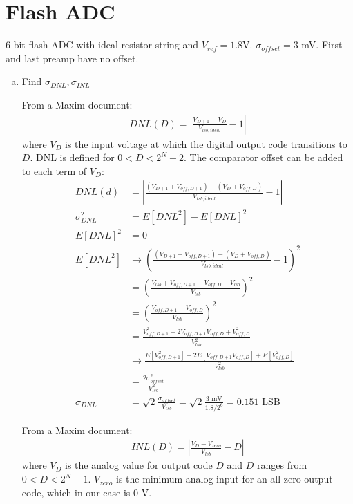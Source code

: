 \documentclass[11pt]{article}
\begin{document}
\section*{Flash ADC}

6-bit flash ADC with ideal resistor string and $V_{ref} = 1.8$V. $\sigma_{offset} = 3$ mV. First and last preamp have no offset.

\begin{enumerate}[a)]
  \item Find $\sigma_{DNL}, \sigma_{INL}$

    From a Maxim document:
    \begin{align*}
      DNL(D) = \left| \frac{V_{D+1} - V_{D}}{V_{lsb,ideal}} - 1 \right|
    \end{align*}
    where $V_{D}$ is the input voltage at which the digital output code transitions to $D$. DNL is defined for $0 < D < 2^N-2$.
    The comparator offset can be added to each term of $V_{D}$:
    \begin{align*}
      DNL(d) &= \left| \frac{(V_{D+1} + V_{off,D+1}) - (V_{D} + V_{off,D})}{V_{lsb,ideal}} - 1 \right| \\
      \sigma_{DNL}^2 &= E[DNL^2] - E[DNL]^2 \\
      E[DNL]^2 &= 0 \\
      E[DNL^2] &\rightarrow \left( \frac{(V_{D+1} + V_{off,D+1}) - (V_{D} + V_{off,D})}{V_{lsb,ideal}} - 1 \right)^2 \\
      &= \left( \frac{V_{lsb} + V_{off,D+1} - V_{off,D} - V_{lsb}}{V_{lsb}} \right)^2 \\
      &= \left( \frac{V_{off,D+1} - V_{off,D}}{V_{lsb}} \right)^2 \\
      &= \frac{V_{off,D+1}^2 - 2 V_{off,D+1} V_{off,D} + V_{off,D}^2}{V_{lsb}^2} \\
      &\rightarrow \frac{E[V_{off,D+1}^2] - 2 E[V_{off,D+1} V_{off,D}] + E[V_{off,D}^2]}{V_{lsb}^2} \\
      &= \frac{2 \sigma_{offset}^2}{V_{lsb}^2} \\
      \sigma_{DNL} &= \sqrt{2} \frac{\sigma_{offset}}{V_{lsb}} = \sqrt{2} \frac{3 \text{ mV}}{1.8 / 2^6} = 0.151 \text{ LSB}
    \end{align*}

    From a Maxim document:
    \begin{align*}
      INL(D) = \left| \frac{V_D - V_{zero}}{V_{lsb}} - D \right|
    \end{align*}
    where $V_{D}$ is the analog value for output code $D$ and $D$ ranges from $0 < D < 2^N - 1$.
    $V_{zero}$ is the minimum analog input for an all zero output code, which in our case is 0 V.


\end{enumerate}
\end{document}
